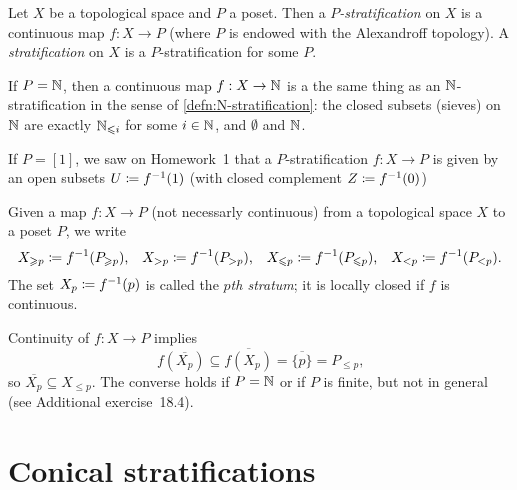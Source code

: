 \begin{defn}
Let \(X\) be a topological space and \(P\) a poset.
Then a \emph{\(P\)-stratification} on \(X\) is a continuous map \(f\colon X\to P\) (where \(P\) is endowed with the Alexandroff topology).
A \emph{stratification} on \(X\) is a \(P\)-stratification for some \(P\).
\end{defn}

\begin{exmp}
If \(P=\mathbb{N}\), then a continuous map \(f\colon X\to\bb N\) is a the same thing as an \(\mathbb{N}\)-stratification in the sense of \cref{defn:N-stratification}: the closed subsets (sieves) on \(\mathbb{N}\) are exactly \(\mathbb{N}_{\leqslant i}\) for some \(i\in\mathbb{N}\), and \(\emptyset\) and \(\mathbb{N}\).
\end{exmp}

\begin{exmp}
If \(P=[1]\), we saw on Homework~1 that a \(P\)-stratification \(f\colon X\to P\) is given by an open subsets \(U\coloneq f^{-1}(1)\) (with closed complement \(Z\coloneq f^{-1}(0)\))
\end{exmp}

\begin{defn}
Given a map \(f\colon X\to P\) (not necessarly continuous) from a topological space \(X\) to a poset \(P\), we write
\[ X_{\geqslant p} \coloneq f^{-1}(P_{\geqslant p})\text{,} \quad X_{>p}\coloneq f^{-1}(P_{>p})\text{,} \quad X_{\leqslant p}\coloneq f^{-1}(P_{\leqslant p})\text{,} \quad X_{<p}\coloneq f^{-1}(P_{<p})\text{.} \]
The set \(X_p\coloneq f^{-1}(p)\) is called the \emph{\(p\)th stratum}; it is locally closed if \(f\) is continuous.
\end{defn}

\begin{rmk}
Continuity of \(f\colon X\to P\) implies
\[ f(\overline{X_p}) \subseteq \overline{f(X_p)} = \overline{\{p\}} = P_{\leq p}\text{,} \]
so \(\overline{X_p}\subseteq X_{\leq p}\).
The converse holds if \(P=\mathbb{N}\) or if \(P\) is finite, but not in general (see Additional exercise~18.4).
\end{rmk}


\section{Conical stratifications}

